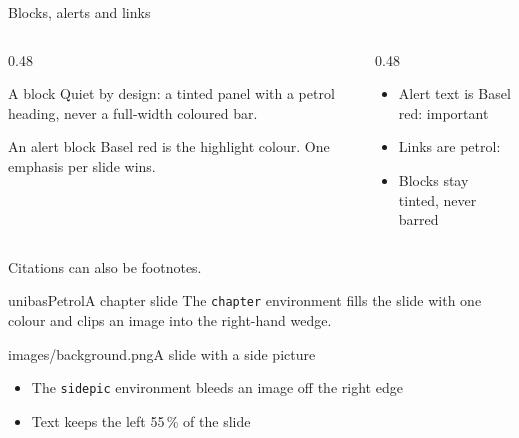 \documentclass{unibaselbeamer}
\begin{document}
\begin{frame}{Blocks, alerts and links}
  \begin{columns}[T]
    \begin{column}{0.48\textwidth}
      \begin{block}{A block}
        Quiet by design: a tinted panel with a petrol heading, never a
        full-width coloured bar.
      \end{block}

      \begin{alertblock}{An alert block}
        Basel red is the highlight colour. One emphasis per slide wins.
      \end{alertblock}
    \end{column}
    \begin{column}{0.48\textwidth}
      \begin{itemize}
        \item Alert text is Basel red: \alert{important}
        \item Links are petrol: 
        \item Blocks stay tinted, never barred
      \end{itemize}
    \end{column}
  \end{columns}

  \vspace{1ex}
  Citations can also be footnotes.
\end{frame}

\begin{chapter}{unibasPetrol}{A chapter slide}
  The \texttt{chapter} environment fills the slide with one colour and clips an
  image into the right-hand wedge.
\end{chapter}

\begin{sidepic}{images/background.png}{A slide with a side picture}
  \begin{itemize}
    \item The \texttt{sidepic} environment bleeds an image off the right edge
    \item Text keeps the left 55\,\% of the slide
  \end{itemize}
\end{sidepic}
\end{document}
